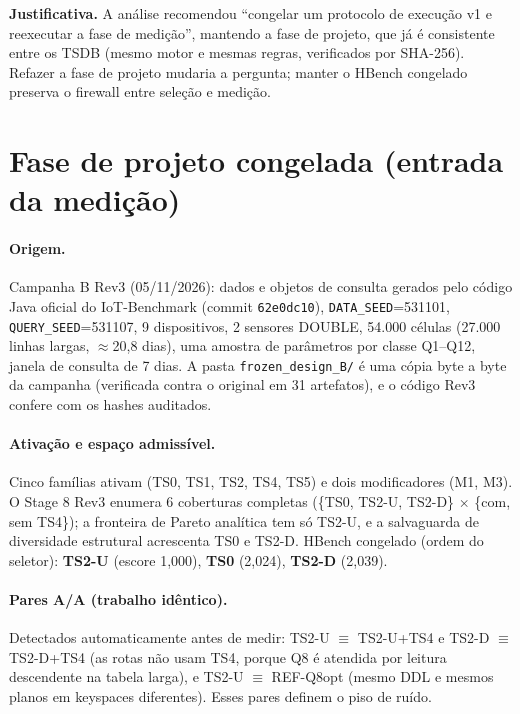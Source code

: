 \documentclass[11pt,a4paper]{article}
\newcommand{\caixa}[2][boxbg]{\par\smallskip\noindent\colorbox{#1}{\parbox{\dimexpr\linewidth-2\fboxsep}{#2}}\par\smallskip}
\newcommand{\just}[1]{\caixa{\textbf{Justificativa.} #1}}
\begin{document}
\just{A análise recomendou ``congelar um protocolo de execução v1 e reexecutar a fase de medição'', mantendo a fase de projeto, que já é consistente entre os TSDB (mesmo motor e mesmas regras, verificados por SHA-256). Refazer a fase de projeto mudaria a pergunta; manter o HBench congelado preserva o firewall entre seleção e medição.}

\section{Fase de projeto congelada (entrada da medição)}
\paragraph{Origem.} Campanha B Rev3 (05/11/2026): dados e objetos de consulta gerados pelo código Java oficial do IoT-Benchmark (commit \texttt{62e0dc10}), \texttt{DATA\_SEED}=531101, \texttt{QUERY\_SEED}=531107, 9 dispositivos, 2 sensores DOUBLE, 54.000 células (27.000 linhas largas, $\approx$20,8 dias), uma amostra de parâmetros por classe Q1--Q12, janela de consulta de 7 dias. A pasta \texttt{frozen\_design\_B/} é uma cópia byte a byte da campanha (verificada contra o original em 31 artefatos), e o código Rev3 confere com os hashes auditados.

\paragraph{Ativação e espaço admissível.} Cinco famílias ativam (TS0, TS1, TS2, TS4, TS5) e dois modificadores (M1, M3). O Stage 8 Rev3 enumera 6 coberturas completas (\{TS0, TS2-U, TS2-D\} $\times$ \{com, sem TS4\}); a fronteira de Pareto analítica tem só TS2-U, e a salvaguarda de diversidade estrutural acrescenta TS0 e TS2-D. HBench congelado (ordem do seletor): \textbf{TS2-U} (escore 1,000), \textbf{TS0} (2,024), \textbf{TS2-D} (2,039).

\paragraph{Pares A/A (trabalho idêntico).} Detectados automaticamente antes de medir: TS2-U $\equiv$ TS2-U+TS4 e TS2-D $\equiv$ TS2-D+TS4 (as rotas não usam TS4, porque Q8 é atendida por leitura descendente na tabela larga), e TS2-U $\equiv$ REF-Q8opt (mesmo DDL e mesmos planos em keyspaces diferentes). Esses pares definem o piso de ruído.
\end{document}
